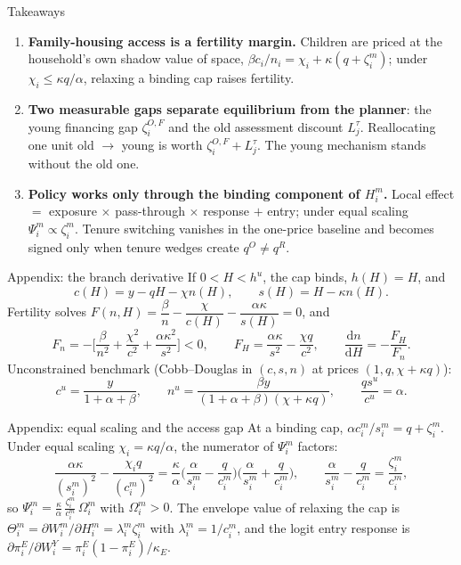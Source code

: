 \documentclass[11pt,aspectratio=169]{beamer}
\newcommand{\dd}{\mathrm d}
\newcommand{\1}{\mathbf 1}
\begin{document}
\begin{frame}{Takeaways}
\begin{enumerate}\setlength{\itemsep}{0.9em}
  \item \textbf{Family-housing access is a fertility margin.} Children are priced at the household's own shadow value of space, $\beta c_i/n_i=\chi_i+\kappa(q+\zeta_i^m)$; under $\chi_i\le\kappa q/\alpha$, relaxing a binding cap raises fertility.
  \item \textbf{Two measurable gaps separate equilibrium from the planner}: the young financing gap $\zeta_i^{O,F}$ and the old assessment discount $L_j^\tau$. Reallocating one unit old $\to$ young is worth $\zeta_i^{O,F}+L_j^\tau$. The young mechanism stands without the old one.
  \item \textbf{Policy works only through the binding component of $H_i^m$.} Local effect $=$ exposure $\times$ pass-through $\times$ response $+$ entry; under equal scaling $\Psi_i^m\propto\zeta_i^m$. Tenure switching vanishes in the one-price baseline and becomes signed only when tenure wedges create $q^O\ne q^R$.
\end{enumerate}
\end{frame}

\appendix

\begin{frame}{Appendix: the branch derivative}
\small
If $0<H<h^u$, the cap binds, $h(H)=H$, and
\[
c(H)=y-qH-\chi n(H),
\qquad
s(H)=H-\kappa n(H).
\]
Fertility solves $F(n,H)=\dfrac{\beta}{n}-\dfrac{\chi}{c(H)}-\dfrac{\alpha\kappa}{s(H)}=0$, and
\[
F_n=-\Big[\frac{\beta}{n^2}+\frac{\chi^2}{c^2}+\frac{\alpha\kappa^2}{s^2}\Big]<0,
\qquad
F_H=\frac{\alpha\kappa}{s^2}-\frac{\chi q}{c^2},
\qquad
\frac{\dd n}{\dd H}=-\frac{F_H}{F_n}.
\]
Unconstrained benchmark (Cobb--Douglas in $(c,s,n)$ at prices $(1,q,\chi+\kappa q)$):
\[
c^u=\frac{y}{1+\alpha+\beta},
\qquad
n^u=\frac{\beta y}{(1+\alpha+\beta)(\chi+\kappa q)},
\qquad
\frac{q s^u}{c^u}=\alpha .
\]
\end{frame}

\begin{frame}{Appendix: equal scaling and the access gap}
\small
At a binding cap, $\alpha c_i^m/s_i^m=q+\zeta_i^m$. Under equal scaling $\chi_i=\kappa q/\alpha$, the numerator of $\Psi_i^m$ factors:
\[
\frac{\alpha\kappa}{(s_i^m)^2}-\frac{\chi_i q}{(c_i^m)^2}
=
\frac{\kappa}{\alpha}
\Big(\frac{\alpha}{s_i^m}-\frac{q}{c_i^m}\Big)
\Big(\frac{\alpha}{s_i^m}+\frac{q}{c_i^m}\Big),
\qquad
\frac{\alpha}{s_i^m}-\frac{q}{c_i^m}=\frac{\zeta_i^m}{c_i^m},
\]
so $\Psi_i^m=\frac{\kappa}{\alpha}\,\frac{\zeta_i^m}{c_i^m}\,\Omega_i^m$ with $\Omega_i^m>0$.
The envelope value of relaxing the cap is $\Theta_i^m=\partial W_i^m/\partial H_i^m=\lambda_i^m\zeta_i^m$ with $\lambda_i^m=1/c_i^m$, and the logit entry response is $\partial\pi_i^E/\partial W_i^Y=\pi_i^E(1-\pi_i^E)/\kappa_E$.
\end{frame}
\end{document}
